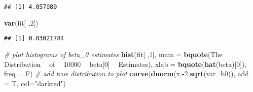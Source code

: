 \documentclass[]{book}
\newenvironment{Shaded}{\begin{snugshade}}{\end{snugshade}}
\newcommand{\KeywordTok}[1]{\textcolor[rgb]{0.13,0.29,0.53}{\textbf{#1}}}
\newcommand{\DataTypeTok}[1]{\textcolor[rgb]{0.13,0.29,0.53}{#1}}
\newcommand{\DecValTok}[1]{\textcolor[rgb]{0.00,0.00,0.81}{#1}}
\newcommand{\StringTok}[1]{\textcolor[rgb]{0.31,0.60,0.02}{#1}}
\newcommand{\CommentTok}[1]{\textcolor[rgb]{0.56,0.35,0.01}{\textit{#1}}}
\newcommand{\ControlFlowTok}[1]{\textcolor[rgb]{0.13,0.29,0.53}{\textbf{#1}}}
\newcommand{\OperatorTok}[1]{\textcolor[rgb]{0.81,0.36,0.00}{\textbf{#1}}}
\newcommand{\NormalTok}[1]{#1}
\theoremstyle{definition}
\theoremstyle{definition}
\theoremstyle{definition}
\theoremstyle{remark}
\begin{document}
\begin{Shaded}
\end{Shaded}

\begin{verbatim}
## [1] 4.057089
\end{verbatim}

\begin{Shaded}
\begin{Highlighting}[]
\KeywordTok{var}\NormalTok{(fit[ ,}\DecValTok{2}\NormalTok{])}
\end{Highlighting}
\end{Shaded}

\begin{verbatim}
## [1] 0.03021784
\end{verbatim}

\begin{Shaded}
\begin{Highlighting}[]
\CommentTok{# plot histograms of beta_0 estimates}
\KeywordTok{hist}\NormalTok{(fit[ ,}\DecValTok{1}\NormalTok{], }
     \DataTypeTok{main =} \KeywordTok{bquote}\NormalTok{(The }\OperatorTok{~}\StringTok{ }\NormalTok{Distribution  }\OperatorTok{~}\StringTok{ }\NormalTok{of }\OperatorTok{~}\StringTok{ }\DecValTok{10000} \OperatorTok{~}\StringTok{ }\NormalTok{beta[}\DecValTok{0}\NormalTok{] }\OperatorTok{~}\StringTok{ }\NormalTok{Estimates), }
     \DataTypeTok{xlab =} \KeywordTok{bquote}\NormalTok{(}\KeywordTok{hat}\NormalTok{(beta)[}\DecValTok{0}\NormalTok{]), }
     \DataTypeTok{freq =}\NormalTok{ F)}
\CommentTok{# add true distribution to plot}
\KeywordTok{curve}\NormalTok{(}\KeywordTok{dnorm}\NormalTok{(x,}\OperatorTok{-}\DecValTok{2}\NormalTok{,}\KeywordTok{sqrt}\NormalTok{(var_b0)), }\DataTypeTok{add =}\NormalTok{ T, }\DataTypeTok{col=}\StringTok{"darkred"}\NormalTok{)}
\end{Highlighting}
\end{Shaded}
\end{document}
